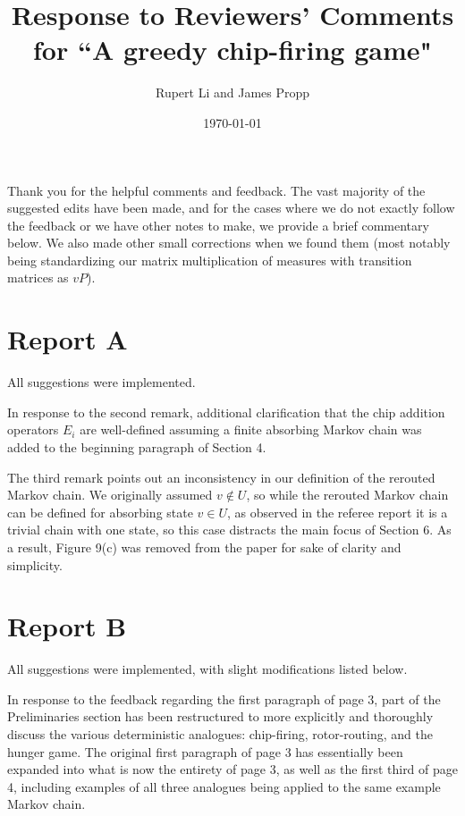 \documentclass[12pt]{amsart}
\begin{document}
\title[Response to Reviewers' Comments]{Response to Reviewers' Comments for 
``A greedy chip-firing game"}
\author[Rupert Li and James Propp]{Rupert Li and James Propp}

\date{\today}

\maketitle

Thank you for the helpful comments and feedback.
The vast majority of the suggested edits have been made, and for the cases 
where we do not exactly follow the feedback or we have other notes to make, 
we provide a brief commentary below.
We also made other small corrections when we found them (most notably being
standardizing our matrix multiplication of measures 
with transition matrices as $vP$).

\section{Report A}
All suggestions were implemented.

In response to the second remark, additional clarification that the chip 
addition operators $E_i$ are well-defined assuming a finite absorbing Markov 
chain was added to the beginning paragraph of Section 4.

The third remark points out an inconsistency in our definition of the rerouted
Markov chain.  We originally assumed $v \not\in U$, so while the rerouted Markov
chain can be defined for absorbing state $v \in U$, as observed in the referee
report it is a trivial chain with one state, so this case distracts the main 
focus of Section 6.  As a result, Figure 9(c) was removed from the paper for 
sake of clarity and simplicity.

\section{Report B}
All suggestions were implemented, with slight modifications listed below.

In response to the feedback regarding the first paragraph of page 3, part of the Preliminaries section has been restructured to more explicitly and thoroughly discuss the various deterministic analogues: chip-firing, rotor-routing, and the hunger game.
The original first paragraph of page 3 has essentially been expanded into what is now the entirety of page 3, as well as the first third of page 4, including examples of all three analogues being applied to the same example Markov chain.
\end{document}
